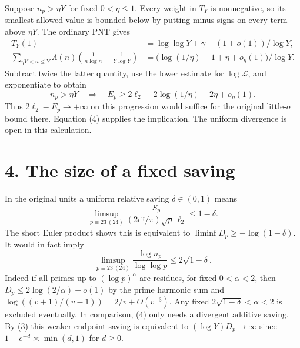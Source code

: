 \documentclass[11pt]{article}
\newcommand{\LL}{\mathcal L}
\begin{document}
Suppose $n_p>\eta Y$ for fixed $0<\eta\le1$. Every weight in $T_Y$ is nonnegative, so its smallest allowed value is bounded below by putting minus signs on every term above $\eta Y$. The ordinary PNT gives
\begin{align*}
 T_Y(1)&=\log\log Y+\gamma-(1+o(1))/\log Y,\\
 \sum_{\eta Y<n\le Y}\Lambda(n)\left(\frac1{n\log n}-\frac1{Y\log Y}\right)
   &=\big(\log(1/\eta)-1+\eta+o_\eta(1)\big)/\log Y .
\end{align*}
Subtract twice the latter quantity, use the lower estimate for $\log\LL$, and exponentiate to obtain
\begin{equation}
 n_p>\eta Y\quad\Longrightarrow\quad
 E_p\ge 2\ell_2-2\log(1/\eta)-2\eta+o_\eta(1).
\end{equation}
Thus $2\ell_2-E_p\to+\infty$ on this progression would suffice for the original little-$o$ bound there. Equation (4) supplies the implication. The uniform divergence is open in this calculation.

\newpage
\section*{4. The size of a fixed saving}
In the original units a uniform relative saving $\delta\in(0,1)$ means
\[
 \limsup_{p\equiv23\ (24)}\frac{S_p}{(2e^\gamma/\pi)\sqrt p\,\ell_2}
       \le1-\delta.
\]
The short Euler product shows this is equivalent to $\liminf D_p\ge-\log(1-\delta)$. It would in fact imply
\[
 \limsup_{p\equiv23\ (24)}
        \frac{\log n_p}{\log\log p}\le2\sqrt{1-\delta}.
\]
Indeed if all primes up to $(\log p)^\alpha$ are residues, for fixed $0<\alpha<2$, then $D_p\le2\log(2/\alpha)+o(1)$ by the prime harmonic sum and $\log((v+1)/(v-1))=2/v+O(v^{-3})$. Any fixed $2\sqrt{1-\delta}<\alpha<2$ is excluded eventually. In comparison, (4) only needs a divergent additive saving. By (3) this weaker endpoint saving is equivalent to $(\log Y)D_p\to\infty$ since $1-e^{-d}\asymp\min(d,1)$ for $d\ge0$.
\end{document}
